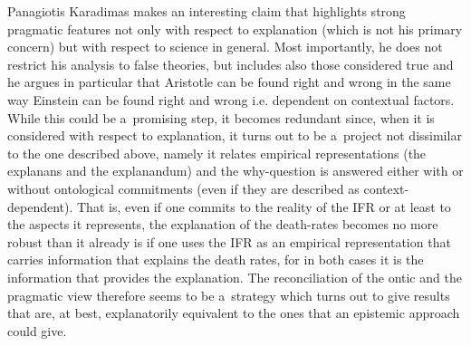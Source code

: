 \begin{artengenv}{Panagiotis Karadimas}
{ makes an interesting claim that highlights strong pragmatic features not only with respect to explanation (which is not his primary concern) but with respect to science in general. Most importantly, he does not restrict his analysis to false theories, but includes also those considered true and he argues in particular that Aristotle can be found right and wrong in the same way Einstein can be found right and wrong i.e. dependent on contextual factors.} While this could be a~promising step, it becomes redundant since, when it is considered with respect to explanation, it turns out to be a~project not dissimilar to the one described above, namely it relates empirical representations (the explanans and the explanandum) and the why-question is answered either with or without ontological commitments (even if they are described as context-dependent). That is, even if one commits to the reality of the IFR or at least to the aspects it represents, the explanation of the death-rates becomes no more robust than it already is if one uses the IFR as an empirical representation that carries information that explains the death rates, for in both cases it is the information that provides the explanation. The reconciliation of the ontic and the pragmatic view therefore seems to be a~strategy which turns out to give results that are, at best, explanatorily equivalent to the ones that an epistemic approach could give.


\end{artengenv}
